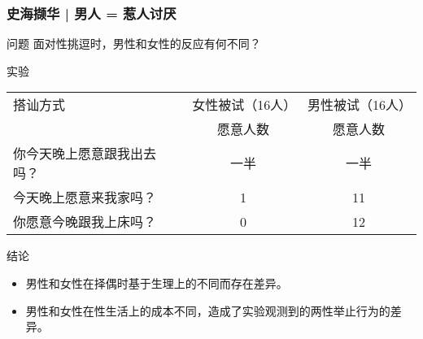 \begin{frame}
  \frametitle{史海撷华 | 男人 = 惹人讨厌}
  \begin{block}{问题}
    面对性挑逗时，男性和女性的反应有何不同？
  \end{block}
  \pause
  \begin{block}{实验}
  \begin{tabular}{lcc}
    \hline
    搭讪方式 & 女性被试（16人） & 男性被试（16人）\\
    & 愿意人数 & 愿意人数\\
    \hline
    你今天晚上愿意跟我出去吗？ & 一半 & 一半\\
    今天晚上愿意来我家吗？ & 1 & 11\\
    你愿意今晚跟我上床吗？ & 0 & 12\\
    \hline
  \end{tabular}
  \end{block}
  \pause
  \begin{block}{结论}
    \begin{itemize}
      \item 男性和女性在择偶时基于生理上的不同而存在差异。
      \item 男性和女性在性生活上的成本不同，造成了实验观测到的两性举止行为的差异。
    \end{itemize}
  \end{block}
\end{frame}

